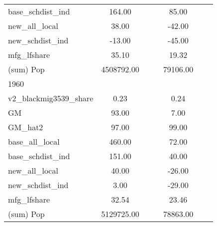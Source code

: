 \begin{table}[htbp]
\begin{tabular}{l*{2}{ccc}}
base\_schdist\_ind    &      164.00&            &            &       85.00&            &            \\
new\_all\_local       &       38.00&            &            &      -42.00&            &            \\
new\_schdist\_ind     &      -13.00&            &            &      -45.00&            &            \\
mfg\_lfshare         &       35.10&            &            &       19.32&            &            \\
(sum) Pop           &  4508792.00&            &            &    79106.00&            &            \\
\midrule
1960                &            &            &            &            &            &            \\
v2\_blackmig3539\_share&        0.23&            &            &        0.24&            &            \\
GM                  &       93.00&            &            &        7.00&            &            \\
GM\_hat2             &       97.00&            &            &       99.00&            &            \\
base\_all\_local      &      460.00&            &            &       72.00&            &            \\
base\_schdist\_ind    &      151.00&            &            &       40.00&            &            \\
new\_all\_local       &       40.00&            &            &      -26.00&            &            \\
new\_schdist\_ind     &        3.00&            &            &      -29.00&            &            \\
mfg\_lfshare         &       32.54&            &            &       23.46&            &            \\
(sum) Pop           &  5129725.00&            &            &    78863.00&            &            \\
\bottomrule
\end{tabular}
\end{table}
